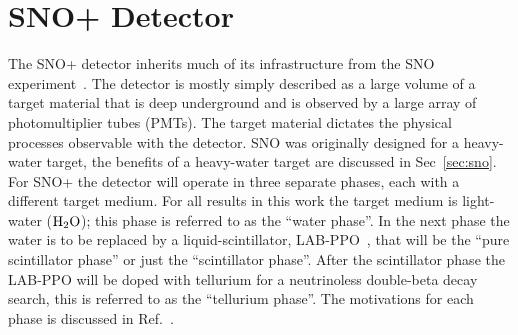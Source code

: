 
\chapter{SNO+ Detector}
\label{sec:detector}

\ifpdf
    \graphicspath{{detector/figures/PNG/}{detector/figures/PDF/}{detector/figures/}}
\else
    \graphicspath{{detector/figures/EPS/}{detector/figures/}}
\fi


The SNO+ detector inherits much of its infrastructure from the SNO
experiment~\citep{sno_detector_paper}.
The detector is mostly simply described as a large volume of a
target material that is deep underground and is observed by a large array of
photomultiplier tubes (PMTs).
The target material dictates the physical processes
observable with the detector.
SNO  was originally designed for a heavy-water
target, the benefits of a heavy-water target are discussed in Sec~\ref{sec:sno}.
For SNO+ the detector will operate in three separate phases, each with a different
target medium.
For all results in this work the target medium is light-water ($\ce{H_{2}O}$);
this phase is referred to as the ``water phase''.
In the next phase the water is to be replaced by a liquid-scintillator,
LAB-PPO~\citep{mchen_labppo}, that will be the ``pure scintillator phase'' or
just the ``scintillator phase''.
After the scintillator phase the LAB-PPO will be doped with tellurium for
a neutrinoless double-beta decay search, this is referred to as the ``tellurium phase''.
The motivations for each phase is discussed in Ref.~\citep{snop_status_prospects}.

